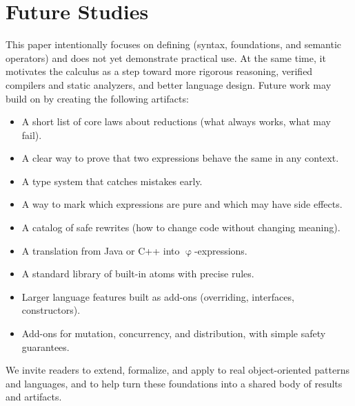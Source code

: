 
\section{Future Studies}\label{sec:future}

This paper intentionally focuses on defining \phic{} (syntax, foundations, and semantic operators) and does not yet demonstrate practical use.
At the same time, it motivates the calculus as a step toward more rigorous reasoning,
  verified compilers and static analyzers, and better language design.
Future work may build on \phic{} by creating the following artifacts:

\begin{itemize}
  \item A short list of core laws about reductions (what always works, what may fail).
  \item A clear way to prove that two expressions behave the same in any context.
  \item A type system that catches mistakes early.
  \item A way to mark which expressions are pure and which may have side effects.
  \item A catalog of safe rewrites (how to change code without changing meaning).
  \item A translation from Java or C++ into \(\upvarphi\)-expressions.
  \item A standard library of built-in atoms with precise rules.
  \item Larger language features built as add-ons (overriding, interfaces, constructors).
  \item Add-ons for mutation, concurrency, and distribution, with simple safety guarantees.
\end{itemize}

We invite readers to extend, formalize, and apply \phic{} to real object-oriented patterns and languages,
  and to help turn these foundations into a shared body of results and artifacts.
